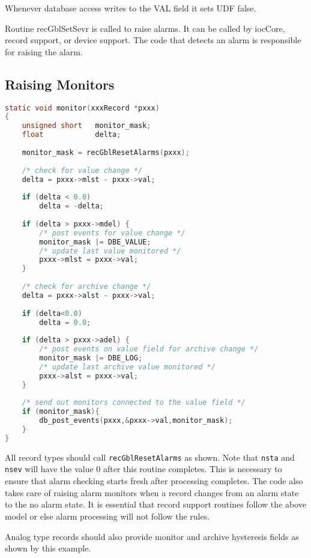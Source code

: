 Whenever database access writes to the VAL field it sets UDF false.

Routine recGblSetSevr is called to raise alarms.
It can be called by iocCore, record support, or device support.
The code that detects an alarm is responsible for raising the alarm.

\subsection{Raising Monitors}

\begin{lstlisting}[language=C]
static void monitor(xxxRecord *pxxx)
{
    unsigned short   monitor_mask;
    float            delta;
    
    monitor_mask = recGblResetAlarms(pxxx);
    
    /* check for value change */
    delta = pxxx->mlst - pxxx->val;
    
    if (delta < 0.0)
        delta = -delta;
    
    if (delta > pxxx->mdel) {
        /* post events for value change */
        monitor_mask |= DBE_VALUE;
        /* update last value monitored */
        pxxx->mlst = pxxx->val;
    }
    
    /* check for archive change */
    delta = pxxx->alst - pxxx->val;
    
    if (delta<0.0)
        delta = 0.0;
    
    if (delta > pxxx->adel) {
        /* post events on value field for archive change */
        monitor_mask |= DBE_LOG;
        /* update last archive value monitored */
        pxxx->alst = pxxx->val;
    }
    
    /* send out monitors connected to the value field */
    if (monitor_mask){
        db_post_events(pxxx,&pxxx->val,monitor_mask);
    }
}
\end{lstlisting}

All record types should call \verb|recGblResetAlarms| as shown.
Note that \verb|nsta| and \verb|nsev| will have the value 0 after this routine completes.
This is necessary to ensure that alarm checking starts fresh after processing completes.
The code also takes care of raising alarm monitors when a record changes from an alarm state to the no alarm state.
It is essential that record support routines follow the above model or else alarm processing will not follow the rules.

Analog type records should also provide monitor and archive hysteresis fields as shown by this example.

